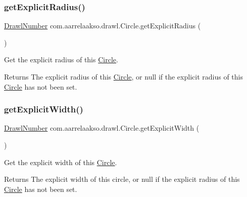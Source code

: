 \subsubsection{\texorpdfstring{get\+Explicit\+Radius()}{getExplicitRadius()}}
{\footnotesize\ttfamily \hyperlink{classcom_1_1aarrelaakso_1_1drawl_1_1_drawl_number}{Drawl\+Number} com.\+aarrelaakso.\+drawl.\+Circle.\+get\+Explicit\+Radius (\begin{DoxyParamCaption}{ }\end{DoxyParamCaption})\hspace{0.3cm}{\ttfamily [protected]}}



Get the explicit radius of this \hyperlink{classcom_1_1aarrelaakso_1_1drawl_1_1_circle}{Circle}. 

\begin{DoxyReturn}{Returns}
The explicit radius of this \hyperlink{classcom_1_1aarrelaakso_1_1drawl_1_1_circle}{Circle}, or {\ttfamily null} if the explicit radius of this \hyperlink{classcom_1_1aarrelaakso_1_1drawl_1_1_circle}{Circle} has not been set. 
\end{DoxyReturn}
\mbox{\label{classcom_1_1aarrelaakso_1_1drawl_1_1_circle_af02bae455881ed2a1570366a2b63c90b}} 
\subsubsection{\texorpdfstring{get\+Explicit\+Width()}{getExplicitWidth()}}
{\footnotesize\ttfamily \hyperlink{classcom_1_1aarrelaakso_1_1drawl_1_1_drawl_number}{Drawl\+Number} com.\+aarrelaakso.\+drawl.\+Circle.\+get\+Explicit\+Width (\begin{DoxyParamCaption}{ }\end{DoxyParamCaption})\hspace{0.3cm}{\ttfamily [protected]}}



Get the explicit width of this \hyperlink{classcom_1_1aarrelaakso_1_1drawl_1_1_circle}{Circle}. 

\begin{DoxyReturn}{Returns}
The explicit width of this circle, or {\ttfamily null} if the explicit radius of this \hyperlink{classcom_1_1aarrelaakso_1_1drawl_1_1_circle}{Circle} has not been set. 
\end{DoxyReturn}
\mbox{\label{classcom_1_1aarrelaakso_1_1drawl_1_1_shape_aaecae2f51794b77ff2f76b1be64b0d90}} 
